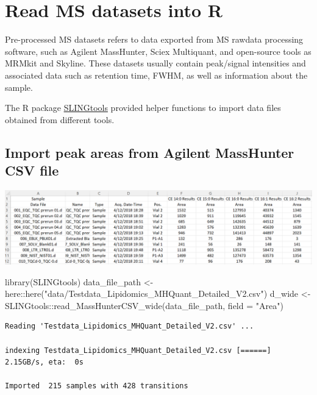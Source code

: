\documentclass[
  letterpaper,
  DIV=11,
  numbers=noendperiod]{scrreprt}
\newenvironment{Shaded}{\begin{snugshade}}{\end{snugshade}}
\newcommand{\AttributeTok}[1]{\textcolor[rgb]{0.40,0.45,0.13}{#1}}
\newcommand{\FunctionTok}[1]{\textcolor[rgb]{0.28,0.35,0.67}{#1}}
\newcommand{\NormalTok}[1]{\textcolor[rgb]{0.00,0.23,0.31}{#1}}
\newcommand{\OtherTok}[1]{\textcolor[rgb]{0.00,0.23,0.31}{#1}}
\newcommand{\SpecialCharTok}[1]{\textcolor[rgb]{0.37,0.37,0.37}{#1}}
\newcommand{\StringTok}[1]{\textcolor[rgb]{0.13,0.47,0.30}{#1}}
\begin{document}
\hypertarget{read-ms-datasets-into-r}{%
\chapter{Read MS datasets into R}\label{read-ms-datasets-into-r}}

Pre-processed MS datasets refers to data exported from MS rawdata
processing software, such as Agilent MassHunter, Sciex Multiquant, and
open-source tools as MRMkit and Skyline. These datasets usually contain
peak/signal intensities and associated data such as retention time,
FWHM, as well as information about the sample.

The R package \href{https://github.com/SLINGhub/SLINGtools}{SLINGtools}
provided helper functions to import data files obtained from different
tools.

\hypertarget{import-peak-areas-from-agilent-masshunter-csv-file}{%
\section{Import peak areas from Agilent MassHunter CSV
file}\label{import-peak-areas-from-agilent-masshunter-csv-file}}

\includegraphics{./images/paste-B702CE09.png}

\begin{Shaded}
\begin{Highlighting}[]
\FunctionTok{library}\NormalTok{(SLINGtools)}
\NormalTok{data\_file\_path }\OtherTok{\textless{}{-}}\NormalTok{ here}\SpecialCharTok{::}\FunctionTok{here}\NormalTok{(}\StringTok{"data/Testdata\_Lipidomics\_MHQuant\_Detailed\_V2.csv"}\NormalTok{)}
\NormalTok{d\_wide }\OtherTok{\textless{}{-}}\NormalTok{ SLINGtools}\SpecialCharTok{::}\FunctionTok{read\_MassHunterCSV\_wide}\NormalTok{(data\_file\_path, }\AttributeTok{field =} \StringTok{"Area"}\NormalTok{)}
\end{Highlighting}
\end{Shaded}

\begin{verbatim}
Reading 'Testdata_Lipidomics_MHQuant_Detailed_V2.csv' ... 

indexing Testdata_Lipidomics_MHQuant_Detailed_V2.csv [======] 2.15GB/s, eta:  0s
                                                                                
Imported  215 samples with 428 transitions 
\end{verbatim}
\end{document}
